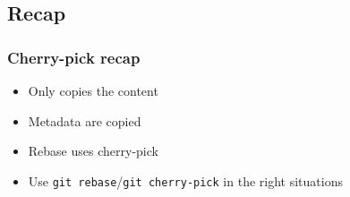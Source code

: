 \subsection{Recap}
\begin{frame}
    \frametitle{Cherry-pick recap}
    \begin{itemize}
        \item Only copies the content
        \item Metadata are copied
        \item Rebase uses cherry-pick
        \item Use \texttt{git rebase}/\texttt{git cherry-pick} in the right situations
    \end{itemize}
\end{frame}

